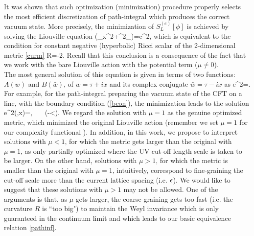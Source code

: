 \documentclass[a4paper,12pt]{article}
\begin{document}
It was shown \cite{Caputa:2017urj} that such optimization (minimization) procedure properly selects the most efficient discretization of path-integral which produces the correct vacuum state. More precisely, the minimization of $S^{(e)}_L[\phi]$ is achieved by solving the Liouville equation 
\be
(\de_x^2+\de^2_\tau)\phi=\mu e^{2\phi},
\ee
which is equivalent to the condition for constant negative (hyperbolic) Ricci scalar of the 2-dimensional metric \eqref{curm}
\be
R=-2\mu.
\ee
Recall that this conclusion is a consequence of the fact that we work with the bare Liouville action with the potential term ($\mu\neq 0$).\\
The most general solution of this equation is given in terms of two functions: $A(w)$ and $B(\bar{w})$, of $w=\tau+ix$ and its complex conjugate $\bar{w}=\tau-ix$ as
\be
e^{2\phi}=.
\ee 
For example, for the path-integral preparing the vacuum state of the CFT on a line, with the boundary condition (\ref{bcon}), the minimization leads to the solution 
\ba
e^{2\phi(\tau,x)}=, \ \ \ (-\infty<\tau{}).\label{SolVP}
\ea
We regard the solution with $\mu=1$ as the genuine optimized metric, which minimized the original Liouville action (remember we set $\mu=1$ for our complexity functional \cite{Caputa:2017urj}). In addition, in this work, we propose to interpret solutions with $\mu<1$, for which the metric gets larger than the original with $\mu=1$, as only partially optimized  where the UV cut-off length scale is taken to be larger. On the other hand, solutions with $\mu>1$, for which the metric is smaller than the original with $\mu=1$, intuitively, correspond to fine-graining the cut-off scale more than the current lattice spacing (i.e. $\epsilon$). We would like to suggest that these solutions with $\mu>1$ may not be allowed. One of the arguments is that, as $\mu$ gets larger, the coarse-graining gets too fast (i.e. the curvature $R$ is ``too big") to maintain the Weyl invariance which is only guaranteed in the continuum limit and which leads to our basic equivalence relation \eqref{pathinf}.
\end{document}
